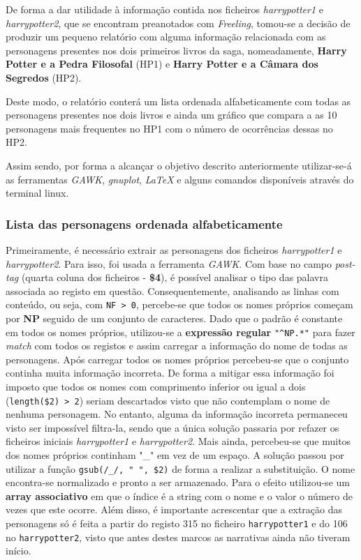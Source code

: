 \documentclass[a4paper]{article}
\begin{document}
\hspace{3mm} De forma a dar utilidade à informação contida nos ficheiros \textit{harrypotter1} e \textit{harrypotter2}, que se encontram preanotados com \textit{Freeling}, tomou-se a decisão de produzir um pequeno relatório com alguma informação relacionada com as personagens presentes nos dois primeiros livros da saga, nomeadamente, \textbf{Harry Potter e a Pedra Filosofal} (HP1) e \textbf{Harry Potter e a Câmara dos Segredos} (HP2).

Deste modo, o relatório conterá um lista ordenada alfabeticamente com todas as personagens presentes nos dois livros e ainda um gráfico que compara a as 10 personagens mais frequentes no HP1 com o número de ocorrências dessas no HP2.

Assim sendo, por forma a alcançar o objetivo descrito anteriormente utilizar-se-á as ferramentas \textit{GAWK}, \textit{gnuplot}, \textit{\LaTeX} e alguns comandos disponíveis através do terminal linux.


\subsubsection{Lista das personagens ordenada alfabeticamente}

\hspace{3mm} Primeiramente, é necessário extrair as personagens dos ficheiros \textit{harrypotter1} e \textit{harrypotter2}. Para isso, foi usada a ferramenta \textit{GAWK}. Com base no campo \textit{post-tag} (quarta coluna dos ficheiros - \textbf{\$4}), é possível analisar o tipo das palavra associada ao registo em questão. Consequentemente, analisando as linhas com conteúdo, ou seja, com \texttt{NF > 0}, percebe-se que todos os nomes próprios começam por \textbf{NP} seguido de um conjunto de caracteres. Dado que o padrão é constante em todos os nomes próprios, utilizou-se a \textbf{expressão regular} \texttt{"\^{}NP.*"} para fazer \textit{match} com todos os registos e assim carregar a informação do nome de todas as personagens. Após carregar todos os nomes próprios percebeu-se que o conjunto continha muita informação incorreta. De forma a mitigar essa informação foi imposto que todos os nomes com comprimento inferior ou igual a dois (\texttt{length(\$2) > 2}) seriam descartados visto que não contemplam o nome de nenhuma personagem. No entanto, alguma da informação incorreta permaneceu visto ser impossível filtra-la, sendo que a única solução passaria por refazer os ficheiros iniciais \textit{harrypotter1} e \textit{harrypotter2}. Mais ainda, percebeu-se que muitos dos nomes próprios continham "\_" em vez de um espaço. A solução passou por utilizar a função \texttt{gsub(/\_/, " ", \$2)} de forma a realizar a substituição. O nome encontra-se normalizado e pronto a ser armazenado. Para o efeito utilizou-se um \textbf{array associativo} em que o índice é a string com o nome e o valor o número de vezes que este ocorre. Além disso, é importante acrescentar que a extração das personagens só é feita a partir do registo 315 no ficheiro \texttt{harrypotter1} e do 106 no \texttt{harrypotter2}, visto que antes destes marcos as narrativas ainda não tiveram início.
\end{document}
